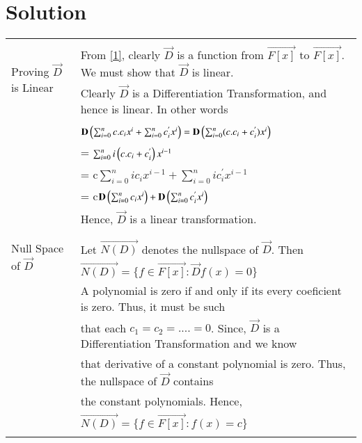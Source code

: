 \documentclass[journal,12pt,twocolumn]{IEEEtran}
\begin{document}
\section{Solution}
\begin{table}[hp]
	\begin{tabular}{|l|l|}
		\hline
		\multirow{3}{*}{Proving $\vec{D}$ is Linear} & \\
		& From \eqref{1}, clearly $\vec{D}$ is a function from $\vec{F[x]}$ to $\vec{F[x]}$. We must show that $\vec{D}$ is linear.\\
		& Clearly $\vec{D}$ is a Differentiation Transformation, and hence is linear. In other words \\
		& \\
		& \qquad \qquad \qquad $\mathbf{D}\left(\sum_{i=0}^{n} c.c_ix^{i} + \sum_{i=0}^{n}c_i^{'}x^{i}\right) = \mathbf{D}\left(\sum_{i=0}^{n}(c.c_i + c_i^{'})x^{i}\right)$\\
		& \qquad \qquad \qquad \qquad \qquad \qquad \qquad \quad \quad \space = $\sum_{i=0}^{n} i\left(c.c_i + c_i^{'}\right)x^{i-1}$ \\
		& \qquad \qquad \qquad \qquad \qquad \qquad \qquad \quad \quad \space = c$\sum_{i=0}^{n}ic_ix^{i-1} + \sum_{i=0}^{n}ic_i^{'}x^{i-1}$\\
		& \qquad \qquad \qquad \qquad \qquad \qquad \qquad \quad \quad \space = c$\mathbf{D}\left(\sum_{i=0}^{n}c_ix^{i}\right) + \mathbf{D}\left(\sum_{i=0}^{n}c_i^{'}x^{i}\right)$ \\
		& Hence, $\vec{D}$ is a linear transformation.\\
		
		& \\
		\hline
		\multirow{3}{*}{Null Space of $\vec{D}$} & \\
		& Let $\vec{N(D)}$ denotes the nullspace of $\vec{D}$. Then\\
		& \qquad \qquad \qquad \qquad \qquad $\vec{N(D)} = \{f \in\vec{F[x]} : \vec{D}f(x) = 0 \}$\\
		& A polynomial is zero if and only if its every coeficient is zero. Thus, it must be such  \\
		& that each $c_1 = c_2 = ....=0$. Since, $\vec{D}$ is a Differentiation Transformation and we know \\
		& that derivative of a constant polynomial is zero. Thus, the nullspace of $\vec{D}$ contains \\
		& the constant polynomials. Hence,\\
		& \qquad \qquad \qquad \qquad \qquad $\vec{N(D)} =\{f \in \vec{F[x]} : f(x) = c \}$ \\
		& \\
		\hline
	\end{tabular}
\end{table}
\end{document}
